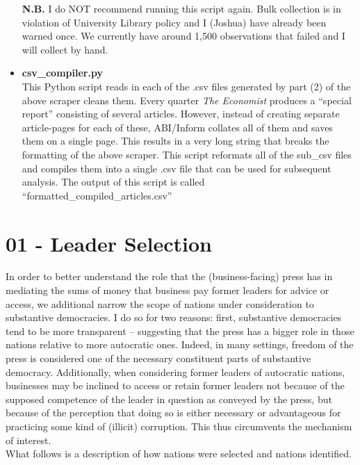 \documentclass[11pt, letterpaper, twoside]{article}
\begin{document}
\begin{itemize}
    \textbf{N.B.} I do NOT recommend running this script again. Bulk collection is in violation of University Library policy and I (Joshua) have already been warned once. We currently have around 1,500 observations that failed and I will collect by hand.
    \item \textbf{csv\_compiler.py}\\
    This Python script reads in each of the .csv files generated by part (2) of the above scraper cleans them. Every quarter \textit{The Economist} produces a ``special report'' consisting of several articles. However, instead of creating separate article-pages for each of these, ABI/Inform collates all of them and saves them on a single page. This results in a very long string that breaks the formatting of the above scraper. This script reformats all of the sub\_csv files and compiles them into a single .csv file that can be used for subsequent analysis. The output of this script is called ``formatted\_compiled\_articles.csv''
\end{itemize}



\section{01 - Leader Selection}

In order to better understand the role that the (business-facing) press has in mediating the sums of money that business pay former leaders for advice or access, we additional narrow the scope of nations under consideration to substantive democracies. I do so for two reasons: first, substantive democracies tend to be more transparent -- suggesting that the press has a bigger role in those nations relative to more autocratic ones. Indeed, in many settings, freedom of the press is considered one of the necessary constituent parts of substantive democracy. Additionally, when considering former leaders of autocratic nations, businesses may be inclined to access or retain former leaders not because of the supposed competence of the leader in question as conveyed by the press, but because of the perception that doing so is either necessary or advantageous for practicing some kind of (illicit) corruption. This thus circumvents the mechanism of interest.\\

What follows is a description of how nations were selected and nations identified.
\end{document}
